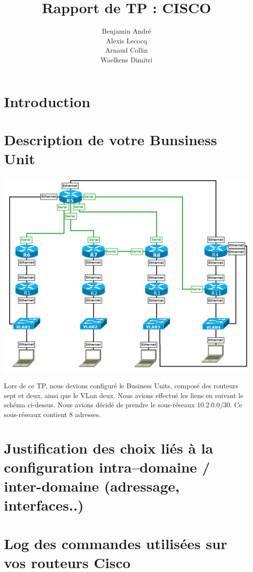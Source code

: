 \documentclass{article}
\author{Benjamin André\\Alexis Lecocq\\Arnaud Collin\\Waelkens Dimitri}
\title{Rapport de TP : CISCO}
\begin{document}
\maketitle

\section{Introduction}%

\section{Description de votre Bunsiness Unit}

\includegraphics[scale=0.2]{image.png}

Lors de ce TP, nous devions configuré le Business Units, composé des routeurs sept et deux, ainsi que le VLan deux. Nous avions effectué les liens en suivant le schéma ci-dessus.
Nous avions décidé de prendre le sous-réseaux 10.2.0.0/30. Ce sous-réseaux contient 8 adresses.

\section{Justification des choix liés à la configuration intra--domaine / inter-domaine (adressage, interfaces..)}

\section{Log des commandes utilisées sur vos routeurs Cisco}
\end{document}
